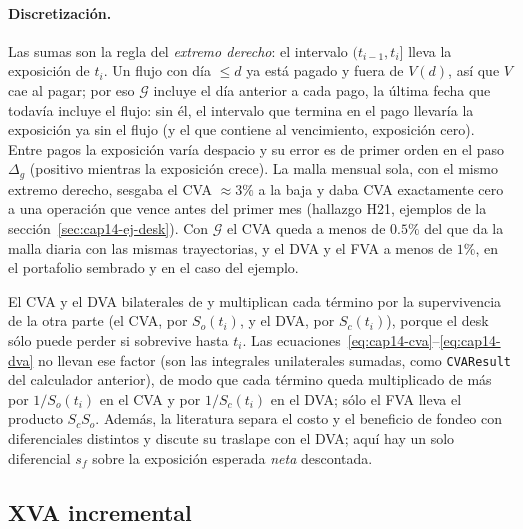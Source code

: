 \begin{sloppypar}
\paragraph{Discretización.} Las sumas son la regla del \emph{extremo derecho}: el intervalo $(t_{i-1},t_i]$ lleva la
exposición de $t_i$. Un flujo con día $\le d$ ya está pagado y fuera de $V(d)$, así que $V$ cae al pagar; por eso
$\mathcal G$ incluye el día anterior a cada pago, la última fecha que todavía incluye el flujo: sin él, el intervalo que
termina en el pago llevaría la exposición ya sin el flujo (y el que contiene al vencimiento, exposición cero). Entre
pagos la exposición varía despacio y su error es de primer orden en el paso $\Delta_g$ (positivo mientras la exposición
crece). La malla mensual sola, con el mismo extremo derecho, sesgaba el CVA $\approx3\%$ a la baja y daba CVA exactamente
cero a una operación que vence antes del primer mes (hallazgo H21, ejemplos de la sección~\ref{sec:cap14-ej-desk}). Con
$\mathcal G$ el CVA queda a menos de $0.5\%$ del que da la malla diaria con las mismas trayectorias, y el DVA y el FVA a
menos de $1\%$, en el portafolio sembrado y en el caso del ejemplo.

\begin{diferencia}
  El CVA y el DVA bilaterales de \citet{brigo2013} y \citet{gregory2015} multiplican cada término por la
  supervivencia de la otra parte (el CVA, por $S_o(t_i)$, y el DVA, por $S_c(t_i)$), porque el desk sólo puede
  perder si sobrevive hasta $t_i$. Las ecuaciones~\eqref{eq:cap14-cva}--\eqref{eq:cap14-dva} no llevan ese factor (son
  las integrales unilaterales sumadas, como \texttt{CVAResult} del calculador anterior), de modo que cada término
  queda multiplicado de más por $1/S_o(t_i)$ en el CVA y por $1/S_c(t_i)$ en el DVA; sólo el FVA lleva el producto
  $S_cS_o$. Además, la literatura separa el costo y
  el beneficio de fondeo con diferenciales distintos y discute su traslape con el DVA; aquí hay un solo
  diferencial $s_f$ sobre la exposición esperada \emph{neta} descontada.
\end{diferencia}

\subsection{XVA incremental}\label{sec:cap14-incremental}


\end{sloppypar}
